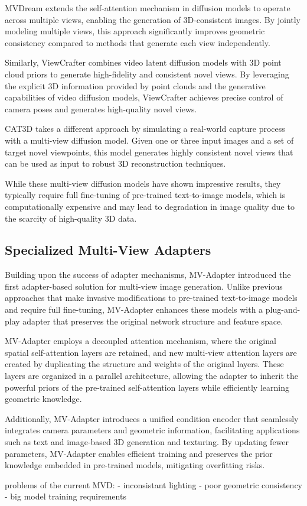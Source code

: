 MVDream \cite{mvdream} extends the self-attention mechanism in
diffusion models to operate across multiple views, enabling the
generation of 3D-consistent images. By jointly modeling multiple
views, this approach significantly improves geometric consistency
compared to methods that generate each view independently.

Similarly, ViewCrafter \cite{viewcrafter} combines video latent
diffusion models \cite{videolatentdiffusion} with 3D point cloud
priors to generate high-fidelity and consistent novel views. By
leveraging the explicit 3D information provided by point clouds and
the generative capabilities of video diffusion models, ViewCrafter
achieves precise control of camera poses and generates high-quality novel views.

CAT3D \cite{cat3d} takes a different approach by simulating a
real-world capture process with a multi-view diffusion model. Given
one or three input images and a set of target novel viewpoints, this
model generates highly consistent novel views that can be used as
input to robust 3D reconstruction techniques.

While these multi-view diffusion models have shown impressive
results, they typically require full fine-tuning of pre-trained
text-to-image models, which is computationally expensive and may lead
to degradation in image quality due to the scarcity of high-quality 3D data.

\subsection{Specialized Multi-View Adapters}

Building upon the success of adapter mechanisms, MV-Adapter
\cite{mvadapter} introduced the first adapter-based solution for
multi-view image generation. Unlike previous approaches that make
invasive modifications to pre-trained text-to-image models and
require full fine-tuning, MV-Adapter enhances these models with a
plug-and-play adapter that preserves the original network structure
and feature space.

MV-Adapter employs a decoupled attention mechanism, where the
original spatial self-attention layers are retained, and new
multi-view attention layers are created by duplicating the structure
and weights of the original layers. These layers are organized in a
parallel architecture, allowing the adapter to inherit the powerful
priors of the pre-trained self-attention layers while efficiently
learning geometric knowledge.

Additionally, MV-Adapter introduces a unified condition encoder that
seamlessly integrates camera parameters and geometric information,
facilitating applications such as text and image-based 3D generation
and texturing. By updating fewer parameters, MV-Adapter enables
efficient training and preserves the prior knowledge embedded in
pre-trained models, mitigating overfitting risks.

problems of the current MVD:
- inconsistant lighting
- poor geometric consistency
- big model training requirements